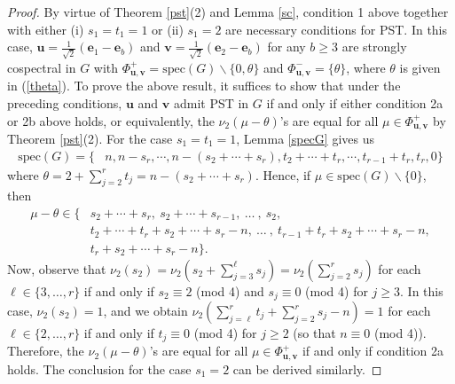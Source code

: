 \documentclass[preprint]{elsarticle}
\newcommand{\supp}{{\Phi}}
\newcommand\spec{{\mathrm{spec}}}
\begin{document}
\begin{proof}
By virtue of Theorem \ref{pst}(2) and Lemma \ref{sc}, condition 1 above together with either (i) $s_1=t_1=1$ or (ii) $s_1=2$ are necessary conditions for PST. In this case, $\mathbf{u}=\frac{1}{\sqrt2}(\mathbf{e}_1-\mathbf{e}_b)$ and $\mathbf{v}=\frac{1}{\sqrt2}(\mathbf{e}_2-\mathbf{e}_b)$ for any $b\geq 3$ are strongly cospectral in $G$ with $\supp_{\mathbf{u},\mathbf{v}}^+=\spec(G)\backslash\{0,\theta\} $ and $ \supp_{\mathbf{u},\mathbf{v}}^-=\{\theta\}$, where $\theta$ is given in (\ref{theta}). To prove the above result, it suffices to show that under the preceding conditions, $\mathbf{u}$ and $\mathbf{v}$ admit PST in $G$ if and only if either condition 2a or 2b above holds, or equivalently, the $\nu_2(\mu-\theta)$'s are equal for all $\mu\in\supp_{\mathbf{u},\mathbf{v}}^+$ by Theorem \ref{pst}(2). For the case $s_1=t_1=1$, Lemma \ref{specG} gives us
\begin{align*}
    \spec(G) = \big\{ 
    & n, n-s_r, \cdots, n-(s_2+\cdots+s_r), t_2+\cdots+t_r, \cdots, t_{r-1}+t_r, t_r, 0 \big\}
\end{align*}
where $\theta=2+\sum_{j=2}^rt_j=n-(s_2+\cdots+s_r)$. Hence, if $\mu\in \spec(G)\backslash\{0\}$, then
\begin{align*}
    \mu-\theta\in \big\{ 
    & s_2+\cdots+s_r, \ s_2+\cdots+s_{r-1}, \ \ldots \ , \ s_2, \\
    &t_2+\cdots+t_r+s_2+\cdots+s_r-n, \ \ldots \ , \ t_{r-1}+t_r+s_2+\cdots+s_r-n, \\
    &t_r+s_2+\cdots+s_r-n\big\}.
\end{align*}
Now, observe that $\nu_2(s_2)=\nu_2(s_2+\sum_{j=3}^\ell s_j)=\nu_2(\sum_{j=2}^rs_j)$ for each $\ell\in\{3,\ldots,r\}$ if and only if $s_2\equiv 2$ (mod 4) and $s_j\equiv 0$ (mod 4) for $j\geq 3$. In this case, $\nu_2(s_2)=1$, and we obtain $\nu_2(\sum_{j=\ell}^rt_j+\sum_{j=2}^rs_j-n)=1$ for each $\ell\in\{2,\ldots,r\}$ if and only if $t_j\equiv 0$ (mod 4) for $j\geq 2$ (so that $n\equiv 0$ (mod 4)). Therefore, the $\nu_2(\mu-\theta)$'s are equal for all $\mu\in\supp_{\mathbf{u},\mathbf{v}}^+$ if and only if condition 2a holds. The conclusion for the case $s_1=2$ can be derived similarly.
\end{proof}
\end{document}
